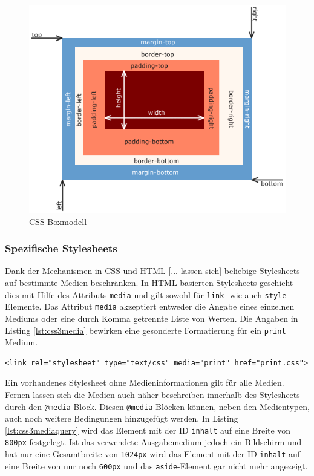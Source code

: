 \vspace{1em}
\begin{figure}[htb]
  \centering
  \includegraphics[width=0.8\linewidth]{abb/css_boxmodell}
  \caption[CSS-Boxmodell]{CSS-Boxmodell\cite{WikiCSS2014}}
  \label{fig:cssboxmodell}
\end{figure}	
	
\subsubsection{Spezifische Stylesheets} \glqq Dank der Mechanismen in CSS und HTML [... lassen sich] beliebige Stylesheets auf bestimmte Medien beschränken. In HTML-basierten Stylesheets geschieht dies mit Hilfe des Attributs \texttt{media} und gilt sowohl für \texttt{link}- wie auch \texttt{style}-Elemente. Das Attribut \texttt{media} akzeptiert entweder die Angabe eines einzelnen Mediums oder eine durch Komma getrennte Liste von Werten.\grqq{}\cite[S.434ff]{MeyeCasc2005} Die Angaben in Listing \ref{lst:css3media} bewirken eine gesonderte Formatierung für ein \texttt{print} Medium.

\vspace{1em}
\begin{lstlisting}[language=HTML5, caption=CSS3 medienspezifisches Stylesheet, label=lst:css3media]
<link rel="stylesheet" type="text/css" media="print" href="print.css">
\end{lstlisting}
	
Ein vorhandenes Stylesheet ohne Medieninformationen gilt für alle Medien. Fernen lassen sich die Medien auch näher beschreiben innerhalb des Stylesheets durch den \texttt{@media}-Block. Diesen \texttt{@media}-Blöcken können, neben den Medientypen, auch noch weitere Bedingungen hinzugefügt werden. In Listing \ref{lst:css3mediaquery} wird das Element mit der ID \texttt{inhalt} auf eine Breite von \texttt{800px} festgelegt. Ist das verwendete Ausgabemedium jedoch ein Bildschirm und hat nur eine Gesamtbreite von \texttt{1024px} wird das Element mit der ID \texttt{inhalt} auf eine Breite von nur noch \texttt{600px} und das \texttt{aside}-Element gar nicht mehr angezeigt.

